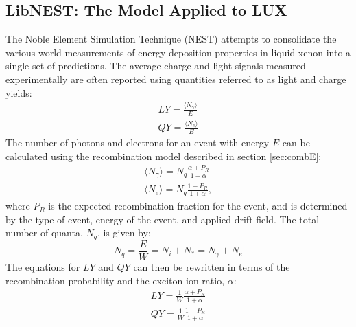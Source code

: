 \subsection{LibNEST: The Model Applied to LUX}\label{sec:libnest}
The Noble Element Simulation Technique (NEST) attempts to consolidate the various world measurements of energy deposition properties in liquid xenon into a single set of predictions\cite{nest1,nest2,lenardo}. The average charge and light signals measured experimentally are often reported using quantities referred to as light and charge yields:
\begin{equation}
\begin{split}
LY=\frac{\langle N_{\gamma}\rangle}{E}\\[1em]
QY=\frac{\langle N_e\rangle}{E}
\end{split}
\end{equation}
The number of photons and electrons for an event with energy $E$ can be calculated using the recombination model described in section \ref{sec:combE}:
\begin{equation}
\begin{split}
\langle N_{\gamma} \rangle=N_q\frac{\alpha +P_R}{1+\alpha}\\[1em]
\langle N_{e} \rangle=N_q\frac{1-P_R}{1+\alpha},
\end{split}
\end{equation}
where $P_R$ is the expected recombination fraction for the event, and is determined by the type of event, energy of the event, and applied drift field. The total number of quanta, $N_q$, is given by:
\begin{equation}
N_q=\frac{E}{W}=N_{i}+N_{*}=N_{\gamma}+N_{e}
\end{equation}
The equations for $LY$ and $QY$ can then be rewritten in terms of the recombination probability and the exciton-ion ratio, $\alpha$:
\begin{equation}
\begin{split}
LY=\frac{1}{W}\frac{\alpha +P_R}{1+\alpha}\\[1em]
QY=\frac{1}{W}\frac{1-P_R}{1+\alpha}
\end{split}
\end{equation}

